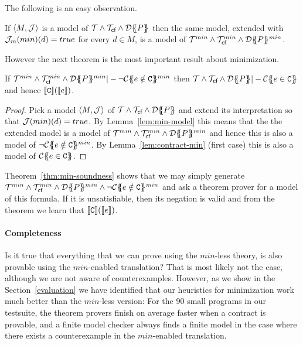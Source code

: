 The following is an easy observation.
\begin{lemma}\label{lem:min-model} If $\langle M,{\cal J}\rangle$ is a model of ${\cal T} \land {\cal T}_{\textsf{cf}} \land {\cal D}\{\!\!\{P\}\!\!\}$ then the same model, extended with
${\cal J}_m(min)(d) = true$ for every $d \in M$, is a model of ${\cal T}^{min} \land {\cal T}_{\textsf{cf}}^{min} \land {\cal D}\{\!\!\{P\}\!\!\}^{min}$.
\end{lemma}
However the next theorem is the most important result about minimization.
\begin{theorem}\label{thm:min-soundness} If $\ThMin\land \Th_{\lcfZ}^{min} \land \dtrans{}{P}^{min} |- \neg \ctransmin{}{}{e \notin \Ct}$ then
                   $\Th \land \Th_{\lcfZ} \land \dtrans{}{P} |- \ctrans{}{}{e \in \Ct}$ and hence $[\![{\tt C}]\!]([\![e]\!])$.
\end{theorem}
\begin{proof}
Pick a model $\langle M, {\cal J}\rangle$ of ${\cal T} \land {\cal T}_{\textsf{cf}} \land {\cal D}\{\!\!\{P\}\!\!\}$ and extend its interpretation
so that ${\cal J}(min)(d) = true$. By Lemma~\ref{lem:min-model} this means that the the extended model is a model of
${\cal T}^{min}\land {\cal T}_{\textsf{cf}}^{min} \land {\cal D}\{\!\!\{P\}\!\!\}^{min}$ and hence this is also a model of $\neg {\cal C}\{\!\!\{e \notin {\tt C}\}\!\!\}^{min}$.
By Lemma~\ref{lem:contract-min} (first case) this is also a model of ${\cal C}\{\!\!\{e \in {\tt C}\}\!\!\}$.
\end{proof}
Theorem~\ref{thm:min-soundness} shows that we may simply generate $\ThMin \land \Th_{\lcfZ}^{min} \land \dtrans{}{P}^{min} \land \neg \ctransmin{}{}{e \notin \Ct}$
and ask a theorem prover for a model of this formula. If it is unsatisfiable, then its negation is valid and from the theorem we learn that $[\![{\tt C}]\!]([\![e]\!])$.


\paragraph{Completeness}

Is it true that everything that we can prove using
the $min$-less theory, is also provable using the $min$-enabled translation?
That is most likely not the case, although we are not aware of counterexamples. However, as we show
in the Section~\ref{evaluation} we have identified that our heuristics for minimization work much
better than the $min$-less version: For the 90 small programs in our testsuite, the theorem provers
finish on average faster when a contract is provable, and a finite model checker always finds a finite
model in the case where there exists a counterexample in the $min$-enabled translation.


